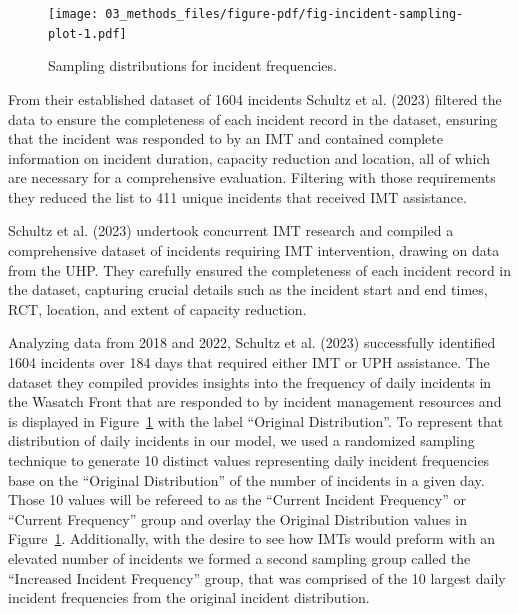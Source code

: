 \documentclass[fancy, oneside, mastersfancy, ms]{byuthesis}
\begin{document}
\begin{figure}

{\centering \texttt{[image: 03\_methods\_files/figure-pdf/fig-incident-sampling-plot-1.pdf]}

}

\caption{\label{fig-incident-sampling-plot}Sampling distributions for
incident frequencies.}

\end{figure}

From their established dataset of 1604 incidents Schultz et al. (2023)
filtered the data to ensure the completeness of each incident record in
the dataset, ensuring that the incident was responded to by an IMT and
contained complete information on incident duration, capacity reduction
and location, all of which are necessary for a comprehensive evaluation.
Filtering with those requirements they reduced the list to 411 unique
incidents that received IMT assistance.

Schultz et al. (2023) undertook concurrent IMT research and compiled a
comprehensive dataset of incidents requiring IMT intervention, drawing
on data from the UHP. They carefully ensured the completeness of each
incident record in the dataset, capturing crucial details such as the
incident start and end times, RCT, location, and extent of capacity
reduction.

Analyzing data from 2018 and 2022, Schultz et al. (2023) successfully
identified 1604 incidents over 184 days that required either IMT or UPH
assistance. The dataset they compiled provides insights into the
frequency of daily incidents in the Wasatch Front that are responded to
by incident management resources and is displayed in
Figure~\ref{fig-incident-sampling-plot} with the label ``Original
Distribution''. To represent that distribution of daily incidents in our
model, we used a randomized sampling technique to generate 10 distinct
values representing daily incident frequencies base on the ``Original
Distribution'' of the number of incidents in a given day. Those 10
values will be refereed to as the ``Current Incident Frequency'' or
``Current Frequency'' group and overlay the Original Distribution values
in Figure~\ref{fig-incident-sampling-plot}. Additionally, with the
desire to see how IMTs would preform with an elevated number of
incidents we formed a second sampling group called the ``Increased
Incident Frequency'' group, that was comprised of the 10 largest daily
incident frequencies from the original incident distribution.
\end{document}
